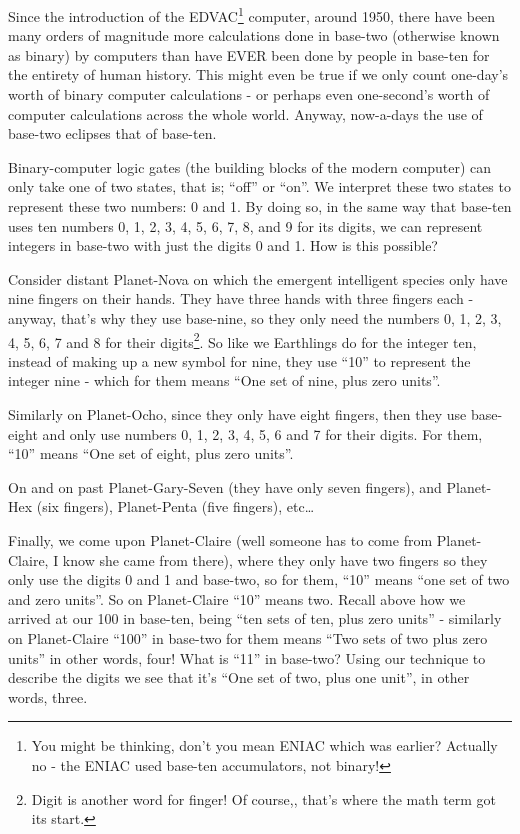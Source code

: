 \documentclass{article}
\begin{document}
Since the introduction of the EDVAC\footnote{You might be thinking, don't you
mean ENIAC which was earlier? Actually no - the ENIAC
used base-ten accumulators, not binary!} computer, around 1950,
there have been many orders of magnitude more calculations done
in base-two (otherwise known as binary) by computers than have EVER
been done by people in base-ten for the entirety of human history.
This might even be true if we only count one-day's worth of
binary computer calculations - or perhaps even one-second's worth
of computer calculations across the whole world.
Anyway, now-a-days the use of base-two eclipses that of base-ten.

Binary-computer logic gates (the building blocks of the modern computer)
can only take one of two states, that is; ``off'' or ``on''.
We interpret these two states to represent these two numbers: 0 and 1.
By doing so, in the same way that base-ten uses ten numbers 0,
1, 2, 3, 4, 5, 6, 7, 8, and 9 for its digits, we can represent integers
in base-two with just the digits 0 and 1. How is this possible?

Consider distant Planet-Nova on which the emergent
intelligent species only have nine fingers on their hands.
They have three hands with three fingers each - anyway,
that's why they use base-nine, so they only need the numbers 0,
1, 2, 3, 4, 5, 6, 7 and 8 for their digits\footnote{Digit
is another word for finger! Of course,, that's where the math term got its start.}.
So like we Earthlings do for the integer ten,
instead of making up a new symbol for nine,
they use ``10'' to represent the integer nine - which
for them means ``One set of nine, plus zero units''.

Similarly on Planet-Ocho, since they only have eight fingers,
then they use base-eight and only use numbers 0, 1,
2, 3, 4, 5, 6 and 7 for their digits. For them, ``10''
means ``One set of eight, plus zero units''.

On and on past Planet-Gary-Seven (they have only seven fingers),
and Planet-Hex (six fingers), Planet-Penta (five fingers), etc\dots{}

Finally, we come upon Planet-Claire (well someone
has to come from Planet-Claire,
I know she came from there),
where they only have two fingers
so they only use the digits 0 and 1 and base-two,
so for them, ``10'' means ``one set of two and zero units''.
So on Planet-Claire ``10'' means two.
Recall above how we arrived at our 100 in base-ten,
being ``ten sets of ten,
plus zero units'' - similarly on Planet-Claire ``100''
in base-two for them means ``Two sets of two plus zero units'' in other words,
four! What is ``11'' in base-two? Using our technique to
describe the digits we see that it's ``One set of two, plus one unit'',
in other words, three.
\end{document}

